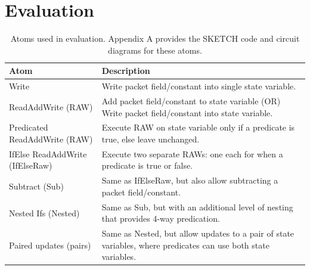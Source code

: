 \section{Evaluation}
\label{s:eval}

\begin{table}[!t]
  \begin{scriptsize}
  \begin{tabular}{|p{}|p{}|}
    \hline
    Atom & Description \\
    \hline
    Write & Write packet field/constant into single state variable. \\
    \hline
    ReadAddWrite (RAW) & Add packet field/constant to state variable (OR) Write packet field/constant into state variable. \\
    \hline
    Predicated ReadAddWrite (RAW) & Execute RAW on state variable only if a predicate is true, else leave unchanged. \\
    \hline
    IfElse ReadAddWrite (IfElseRaw) & Execute two separate RAWs: one each for when a predicate is true or false.\\
    \hline
    Subtract (Sub) & Same as IfElseRaw, but also allow subtracting a packet field/constant. \\
    \hline
    Nested Ifs (Nested) & Same as Sub, but with an additional level of nesting that provides 4-way predication. \\
    \hline
    Paired updates (pairs) & Same as Nested, but allow updates to a pair of state variables, where predicates can use both state variables. \\
    \hline
  \end{tabular}
  \end{scriptsize}
  \caption{Atoms used in evaluation. Appendix A provides the SKETCH code and
  circuit diagrams for these atoms.}
  \label{tab:templates}
\end{table}

